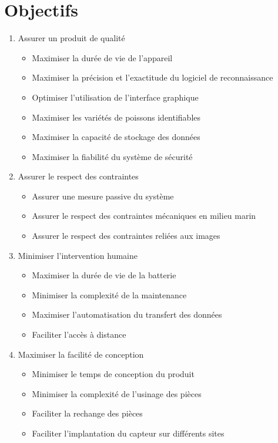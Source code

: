 \newpage{}

\section{Objectifs}

\begin{enumerate}

    \item Assurer un produit de qualité
    \begin{itemize}
        \item Maximiser la durée de vie de l'appareil
        \item Maximiser la précision et l'exactitude du logiciel de reconnaissance 
        \item Optimiser l'utilisation de l'interface graphique
        \item Maximiser les variétés de poissons identifiables
        \item Maximiser la capacité de stockage des données
        \item Maximiser la fiabilité du système de sécurité
    \end{itemize}
    
    \item Assurer le respect des contraintes
    \begin{itemize}
        \item Assurer une mesure passive du système
        \item Assurer le respect des contraintes mécaniques en milieu marin
        \item Assurer le respect des contraintes reliées aux images
    \end{itemize}

    \item Minimiser l'intervention humaine
    \begin{itemize}
        \item Maximiser la durée de vie de la batterie
        \item Minimiser la complexité de la maintenance
        \item Maximiser l'automatisation du transfert des données
        \item Faciliter l'accès à distance
    \end{itemize}
    
    \item Maximiser la facilité de conception
    \begin{itemize}
        \item Minimiser le temps de conception du produit
        \item Minimiser la complexité de l'usinage des pièces
        \item Faciliter la rechange des pièces
        \item Faciliter l'implantation du capteur sur différents sites
    \end{itemize}
    

\end{enumerate}
